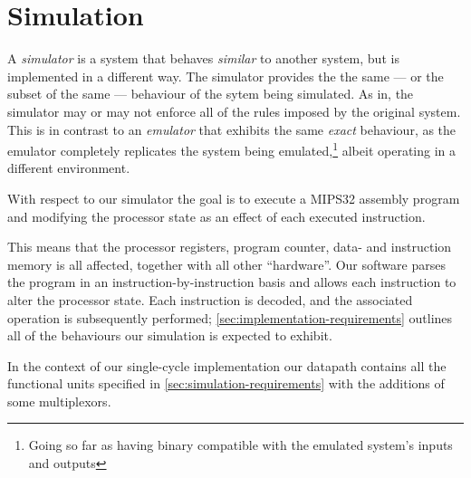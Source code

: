 \section{Simulation}\label{sec:simulation}

A \emph{simulator} is a system that behaves \emph{similar} to another
system, but is implemented in a different way. The simulator provides
the the same --- or the subset of the same --- behaviour of the sytem
being simulated. As in, the simulator may or may not enforce all of
the rules imposed by the original system. This is in contrast to an
\emph{emulator} that exhibits the same \emph{exact} behaviour, as the
emulator completely replicates the system being
emulated,\footnote{Going so far as having binary compatible with the
  emulated system's inputs and outputs} albeit operating in a
different environment.

With respect to our simulator the goal is to execute a MIPS32 assembly
program and modifying the processor state as an effect of each
executed instruction. 

This means that the processor registers, program counter, data- and
instruction memory is all affected, together with all other
``hardware''. Our software parses the program in an
instruction-by-instruction basis and allows each instruction to alter
the processor state. Each instruction is decoded, and the associated
operation is subsequently performed;
\autoref{sec:implementation-requirements} outlines all of the
behaviours our simulation is expected to exhibit.

In the context of our single-cycle implementation our datapath
contains all the functional units specified in
\autoref{sec:simulation-requirements} with the additions of
some multiplexors.

